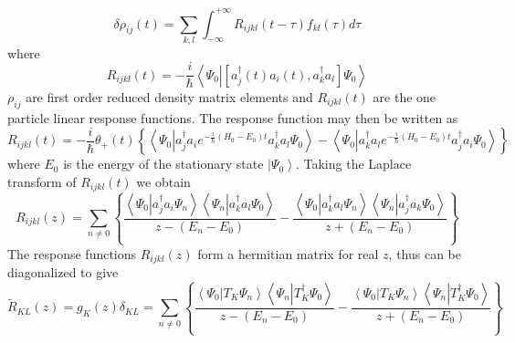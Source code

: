 \documentclass[aps,preprint]{revtex4}%
\begin{document}
\begin{equation}
\delta\rho_{ij}\left(  t\right)  =\sum_{k,l}\int_{-\infty}^{+\infty}%
R_{ijkl}\left(  t-\tau\right)  f_{kl}\left(  \tau\right)  d\tau
\end{equation}
where
\begin{equation}
R_{ijkl}\left(  t\right)  =-\frac{i}{\hslash}\left\langle \Psi_{0}\left\vert
\left[  a_{j}^{\dagger}\left(  t\right)  a_{i}\left(  t\right)  ,a_{k}%
^{\dagger}a_{l}\right]  \right.  \Psi_{0}\right\rangle
\end{equation}
$\rho_{ij}$ are first order reduced density matrix elements and $R_{ijkl}%
\left(  t\right)  $ are the one particle linear response functions. The
response function may then be written as
\begin{equation}
R_{ijkl}\left(  t\right)  =-\frac{i}{\hslash}\theta_{+}\left(  t\right)
\left\{  \left\langle \Psi_{0}\left\vert a_{j}^{\dagger}a_{i}e^{-\frac
{i}{\hslash}\left(  H_{0}-E_{0}\right)  t}a_{k}^{\dagger}a_{l}\right.
\Psi_{0}\right\rangle -\left\langle \Psi_{0}\left\vert a_{k}^{\dagger}%
a_{l}e^{-\frac{i}{\hslash}\left(  H_{0}-E_{0}\right)  t}a_{j}^{\dagger}%
a_{i}\right.  \Psi_{0}\right\rangle \right\}
\end{equation}
where $E_{0}$ is the energy of the stationary state $\left\vert \Psi
_{0}\right\rangle $. Taking the Laplace transform of $R_{ijkl}\left(
t\right)  $ we obtain
\begin{equation}
R_{ijkl}\left(  z\right)  =\sum_{n\neq0}\left\{  \frac{\left\langle \Psi
_{0}\left\vert a_{j}^{\dagger}a_{i}\Psi_{n}\right.  \right\rangle \left\langle
\Psi_{n}\left\vert a_{k}^{\dagger}a_{l}\Psi_{0}\right.  \right\rangle
}{z-\left(  E_{n}-E_{0}\right)  }-\frac{\left\langle \Psi_{0}\left\vert
a_{k}^{\dagger}a_{l}\Psi_{n}\right.  \right\rangle \left\langle \Psi
_{n}\left\vert a_{j}^{\dagger}a_{k}\Psi_{0}\right.  \right\rangle }{z+\left(
E_{n}-E_{0}\right)  }\right\}
\end{equation}
The response functions $R_{ijkl}\left(  z\right)  $ form a hermitian matrix
for real $z$, thus can be diagonalized to give
\begin{equation}
\tilde{R}_{KL}\left(  z\right)  =g_{K}\left(  z\right)  \delta_{KL}%
=\sum_{n\neq0}\left\{  \frac{\left\langle \Psi_{0}\left\vert T_{K}\Psi
_{n}\right.  \right\rangle \left\langle \Psi_{n}\left\vert T_{K}^{\dagger}%
\Psi_{0}\right.  \right\rangle }{z-\left(  E_{n}-E_{0}\right)  }%
-\frac{\left\langle \Psi_{0}\left\vert T_{K}\Psi_{n}\right.  \right\rangle
\left\langle \Psi_{n}\left\vert T_{K}^{\dagger}\Psi_{0}\right.  \right\rangle
}{z+\left(  E_{n}-E_{0}\right)  }\right\}
\end{equation}
\end{document}

